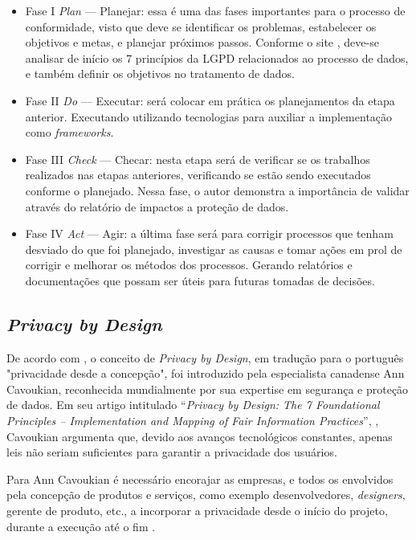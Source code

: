 \documentclass[
	12pt,				%
	openright,			%
	oneside,			%
	a4paper,			%
	english,			%
	french,				%
	spanish,			%
	brazil,				%
	]{abntex2}
\begin{document}
\begin{itemize}

\item Fase I  \textit{Plan} — Planejar: essa é uma das fases importantes para o processo de conformidade, visto que deve se identificar os problemas, estabelecer os objetivos e metas, e planejar próximos passos. Conforme o site , deve-se analisar de início os 7 princípios da LGPD relacionados ao processo de dados, e também definir os objetivos no tratamento de dados.
\item Fase II \textit{Do} — Executar: será colocar em prática os planejamentos da etapa anterior. Executando utilizando tecnologias para auxiliar a implementação como \textit{frameworks}.
\item Fase III \textit{Check} — Checar: nesta etapa será de verificar se os trabalhos realizados nas etapas anteriores, verificando se estão sendo executados conforme o planejado. Nessa fase, o autor demonstra a importância de validar através do relatório de impactos a proteção de dados.
\item Fase IV \textit{Act} — Agir:  a última fase será para corrigir processos que tenham desviado do que foi planejado, investigar as causas e tomar ações em prol de corrigir e melhorar os métodos dos processos. Gerando relatórios e documentações que possam ser úteis para futuras tomadas de decisões.
\end{itemize}

\subsection{ \textit{Privacy by Design}  }

De acordo com \cite{oliveira2020}, o conceito de \textit{Privacy by Design}, em tradução para o português "privacidade desde a concepção", foi introduzido pela especialista canadense Ann Cavoukian, reconhecida mundialmente por sua expertise em segurança e proteção de dados. Em seu artigo intitulado “\textit{Privacy by Design: The 7 Foundational Principles – Implementation and Mapping of Fair Information Practices}”, \cite{Jimene2020}, Cavoukian argumenta que, devido aos avanços tecnológicos constantes, apenas leis não seriam suficientes para garantir a privacidade dos usuários. 

Para Ann Cavoukian é necessário encorajar as empresas, e todos os envolvidos pela concepção de produtos e serviços, como exemplo desenvolvedores, \textit{designers}, gerente de produto, etc., a incorporar a privacidade desde o início do projeto, durante a execução até o fim \cite{Vainzof2020}. 
\end{document}
